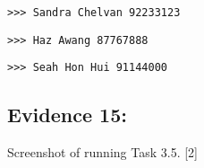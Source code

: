 \noindent\begin{minipage}[t]{1\columnwidth}%
\texttt{>\textcompwordmark >\textcompwordmark > Sandra Chelvan 92233123 }

\texttt{>\textcompwordmark >\textcompwordmark > Haz Awang 87767888 }

\texttt{>\textcompwordmark >\textcompwordmark > Seah Hon Hui 91144000 }%
\end{minipage}

\subsection*{Evidence 15:}

Screenshot of running Task 3.5. \hfill{}{[}2{]}